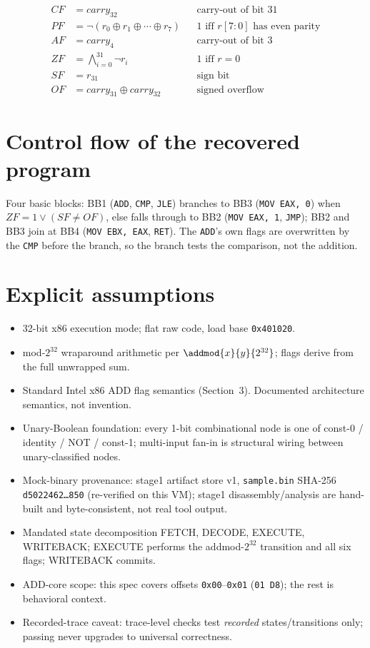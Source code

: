 \documentclass[11pt]{article}
\begin{document}
\begin{align*}
CF &= carry_{32} && \text{carry-out of bit 31} \\
PF &= \lnot (r_0 \oplus r_1 \oplus \cdots \oplus r_7)
    && \text{1 iff $r[7{:}0]$ has even parity} \\
AF &= carry_{4} && \text{carry-out of bit 3} \\
ZF &= \bigwedge_{i=0}^{31} \lnot r_i && \text{1 iff $r = 0$} \\
SF &= r_{31} && \text{sign bit} \\
OF &= carry_{31} \oplus carry_{32} && \text{signed overflow}
\end{align*}

\section{Control flow of the recovered program}

Four basic blocks: BB1 (\texttt{ADD}, \texttt{CMP}, \texttt{JLE}) branches to
BB3 (\texttt{MOV EAX, 0}) when $ZF = 1 \lor (SF \ne OF)$, else falls through
to BB2 (\texttt{MOV EAX, 1}, \texttt{JMP}); BB2 and BB3 join at BB4
(\texttt{MOV EBX, EAX}, \texttt{RET}). The \texttt{ADD}'s own flags are
overwritten by the \texttt{CMP} before the branch, so the branch tests the
comparison, not the addition.

\section{Explicit assumptions}

\begin{itemize}
\item[A1.] 32-bit x86 execution mode; flat raw code, load base \texttt{0x401020}.
\item[A2.] mod-$2^{32}$ wraparound arithmetic per $\addmod{x}{y}{2^{32}}$;
  flags derive from the full unwrapped sum.
\item[A3.] Standard Intel x86 ADD flag semantics (Section~3). Documented
  architecture semantics, not invention.
\item[A4.] Unary-Boolean foundation: every 1-bit combinational node is one of
  const-0 / identity / NOT / const-1; multi-input fan-in is structural wiring
  between unary-classified nodes.
\item[A5.] Mock-binary provenance: stage1 artifact store v1,
  \texttt{sample.bin} SHA-256 \texttt{d5022462\ldots850} (re-verified on this
  VM); stage1 disassembly/analysis are hand-built and byte-consistent, not
  real tool output.
\item[A6.] Mandated state decomposition FETCH, DECODE, EXECUTE, WRITEBACK;
  EXECUTE performs the addmod-$2^{32}$ transition and all six flags;
  WRITEBACK commits.
\item[A7.] ADD-core scope: this spec covers offsets \texttt{0x00}--\texttt{0x01}
  (\texttt{01 D8}); the rest is behavioral context.
\item[A8.] Recorded-trace caveat: trace-level checks test \emph{recorded}
  states/transitions only; passing never upgrades to universal correctness.
\end{itemize}
\end{document}
